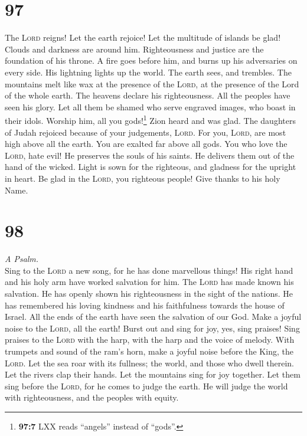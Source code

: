 \hypertarget{section-96}{%
\section{97}\label{section-96}}

 The \textsc{Lord} reigns! Let the earth rejoice! Let the
multitude of islands be glad!  Clouds and darkness are
around him. Righteousness and justice are the foundation of his throne.
 A fire goes before him, and burns up his adversaries on
every side.  His lightning lights up the world. The earth
sees, and trembles.  The mountains melt like wax at the
presence of the \textsc{Lord}, at the presence of the Lord of the whole
earth.  The heavens declare his righteousness. All the
peoples have seen his glory.  Let all them be shamed who
serve engraved images, who boast in their idols. Worship him, all you
gods!\footnote{\textbf{97:7} LXX reads ``angels'' instead of ``gods''.}
 Zion heard and was glad. The daughters of Judah rejoiced
because of your judgements, \textsc{Lord}.  For you,
\textsc{Lord}, are most high above all the earth. You are exalted far
above all gods.  You who love the \textsc{Lord}, hate
evil! He preserves the souls of his saints. He delivers them out of the
hand of the wicked.  Light is sown for the righteous, and
gladness for the upright in heart.  Be glad in the
\textsc{Lord}, you righteous people! Give thanks to his holy Name.

\hypertarget{section-97}{%
\section{98}\label{section-97}}

\emph{A Psalm.}\\
 Sing to the \textsc{Lord} a new song, for he has done
marvellous things! His right hand and his holy arm have worked salvation
for him.  The \textsc{Lord} has made known his salvation.
He has openly shown his righteousness in the sight of the nations.
 He has remembered his loving kindness and his
faithfulness towards the house of Israel. All the ends of the earth have
seen the salvation of our God.  Make a joyful noise to the
\textsc{Lord}, all the earth! Burst out and sing for joy, yes, sing
praises!  Sing praises to the \textsc{Lord} with the harp,
with the harp and the voice of melody.  With trumpets and
sound of the ram's horn, make a joyful noise before the King, the
\textsc{Lord}.  Let the sea roar with its fullness; the
world, and those who dwell therein.  Let the rivers clap
their hands. Let the mountains sing for joy together.  Let
them sing before the \textsc{Lord}, for he comes to judge the earth. He
will judge the world with righteousness, and the peoples with equity.

